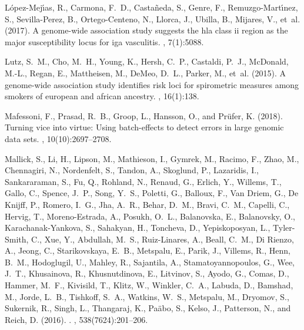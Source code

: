 \documentclass[9pt,article]{template}
\begin{document}
\begin{thebibliography}{}
L{\'o}pez-Mej{\'\i}as, R., Carmona, F.~D., Casta{\~n}eda, S., Genre, F.,
  Remuzgo-Mart{\'\i}nez, S., Sevilla-Perez, B., Ortego-Centeno, N., Llorca, J.,
  Ubilla, B., Mijares, V., et~al. (2017).
\newblock A genome-wide association study suggests the hla class ii region as
  the major susceptibility locus for iga vasculitis.
, 7(1):5088.

Lutz, S.~M., Cho, M.~H., Young, K., Hersh, C.~P., Castaldi, P.~J., McDonald,
  M.-L., Regan, E., Mattheisen, M., DeMeo, D.~L., Parker, M., et~al. (2015).
\newblock A genome-wide association study identifies risk loci for spirometric
  measures among smokers of european and african ancestry.
, 16(1):138.

Mafessoni, F., Prasad, R.~B., Groop, L., Hansson, O., and Pr{\"u}fer, K.
  (2018).
\newblock Turning vice into virtue: Using batch-effects to detect errors in
  large genomic data sets.
, 10(10):2697--2708.

Mallick, S., Li, H., Lipson, M., Mathieson, I., Gymrek, M., Racimo, F., Zhao,
  M., Chennagiri, N., Nordenfelt, S., Tandon, A., Skoglund, P., Lazaridis, I.,
  Sankararaman, S., Fu, Q., Rohland, N., Renaud, G., Erlich, Y., Willems, T.,
  Gallo, C., Spence, J.~P., Song, Y.~S., Poletti, G., Balloux, F., {Van Driem},
  G., {De Knijff}, P., Romero, I.~G., Jha, A.~R., Behar, D.~M., Bravi, C.~M.,
  Capelli, C., Hervig, T., Moreno-Estrada, A., Posukh, O.~L., Balanovska, E.,
  Balanovsky, O., Karachanak-Yankova, S., Sahakyan, H., Toncheva, D.,
  Yepiskoposyan, L., Tyler-Smith, C., Xue, Y., Abdullah, M.~S., Ruiz-Linares,
  A., Beall, C.~M., {Di Rienzo}, A., Jeong, C., Starikovskaya, E.~B., Metspalu,
  E., Parik, J., Villems, R., Henn, B.~M., Hodoglugil, U., Mahley, R.,
  Sajantila, A., Stamatoyannopoulos, G., Wee, J.~T., Khusainova, R.,
  Khusnutdinova, E., Litvinov, S., Ayodo, G., Comas, D., Hammer, M.~F.,
  Kivisild, T., Klitz, W., Winkler, C.~A., Labuda, D., Bamshad, M., Jorde,
  L.~B., Tishkoff, S.~A., Watkins, W.~S., Metspalu, M., Dryomov, S., Sukernik,
  R., Singh, L., Thangaraj, K., Pa{\"{a}}bo, S., Kelso, J., Patterson, N., and
  Reich, D. (2016).
.
, 538(7624):201--206.


\end{thebibliography}
\end{document}
